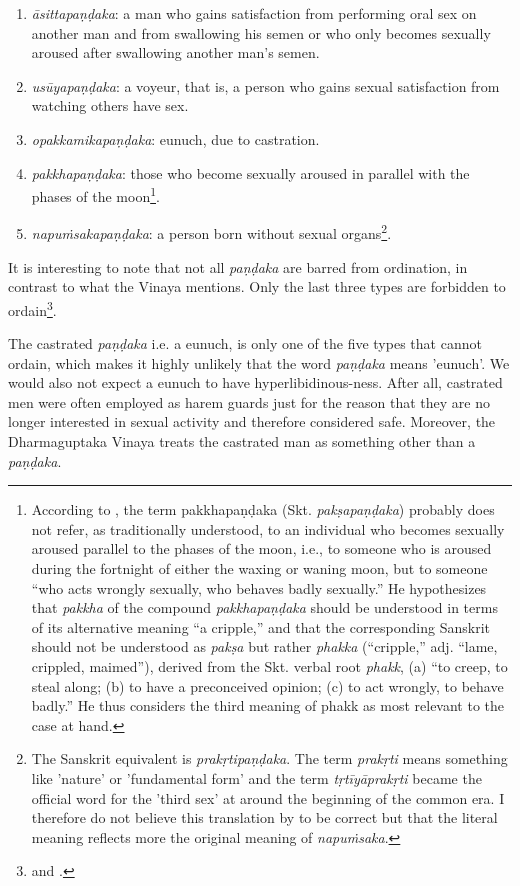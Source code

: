 \begin{enumerate}
\item {\em āsittapaṇḍaka}: a man who gains satisfaction from performing oral sex on another man and from swallowing his semen or who only becomes sexually aroused after swallowing another man’s semen. 
\item {\em usūyapaṇḍaka}: a voyeur, that is, a person who gains sexual satisfaction from watching others have sex. 
\item {\em opakkamikapaṇḍaka}: eunuch, due to castration.
\item {\em pakkhapaṇḍaka}: those who become sexually aroused in parallel with the phases of the moon\footnote{According to \cite{bomhard}, the term pakkhapaṇḍaka (Skt. {\em pakṣapaṇḍaka}) probably does not refer, as traditionally understood, to an individual who becomes sexually aroused parallel to the phases of the moon, i.e., to someone who is aroused during the fortnight of either the waxing or waning moon, but to someone “who acts wrongly sexually, who behaves badly sexually.” He hypothesizes that {\em pakkha} of the compound {\em pakkhapaṇḍaka} should be understood in terms of its alternative meaning “a cripple,” and that the corresponding Sanskrit should not be understood as {\em pakṣa} but rather {\em phakka} (“cripple,” adj. “lame, crippled, maimed”), derived from the Skt. verbal root {\em phakk}, (a) “to creep, to steal along; (b) to have a preconceived opinion; (c) to act wrongly, to behave badly.” He thus considers the third meaning of phakk as most relevant to the case at hand.}.
\item {\em napuṁsakapaṇḍaka}: a person born without sexual organs\footnote{The Sanskrit equivalent is {\em prakṛtipaṇḍaka}. The term {\em prakṛti} means something like 'nature' or 'fundamental form' and the term {\em tṛtīyāprakṛti} became the official word for the 'third sex' at around the beginning of the common era. I therefore do not believe this translation by \cite{thanissaro} to be correct but that the literal meaning reflects more the original meaning of {\em napuṁsaka}.}. 
\end{enumerate}

It is interesting to note that not all {\em paṇḍaka} are barred from ordination, in contrast to what the Vinaya mentions. Only the last three types are forbidden to ordain\footnote{\cite{wong} and \cite{thanissaro}.}.

The castrated {\em paṇḍaka} i.e. a eunuch, is only one of the five types that cannot ordain, which makes it highly unlikely that the word {\em paṇḍaka} means 'eunuch'. We would also not expect a eunuch to have hyperlibidinous-ness. After all, castrated men were often employed as harem guards just for the reason that they are no longer interested in sexual activity and therefore considered safe. Moreover, the Dharmaguptaka Vinaya treats the castrated man as something other than a {\em paṇḍaka}.

